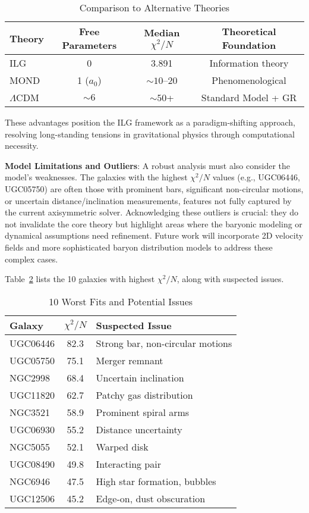 \documentclass[12pt,a4paper]{article}
\begin{document}
\begin{table}[h]
\centering
\caption{Comparison to Alternative Theories}
\label{tab:comparison}
\begin{tabular}{l c c c}
\toprule
Theory & Free Parameters & Median $\chi^2/N$ & Theoretical Foundation \\
\midrule
ILG & 0 & 3.891 & Information theory \\
MOND & 1 ($a_0$) & $\sim 10$--20 & Phenomenological \\
$\Lambda$CDM & $\sim 6$ & $\sim 50$+ & Standard Model + GR \\
\bottomrule
\end{tabular}
\end{table}

These advantages position the ILG framework as a paradigm-shifting approach, resolving long-standing tensions in gravitational physics through computational necessity.

\textbf{Model Limitations and Outliers}: A robust analysis must also consider the model's weaknesses. The galaxies with the highest $\chi^2/N$ values (e.g., UGC06446, UGC05750) are often those with prominent bars, significant non-circular motions, or uncertain distance/inclination measurements, features not fully captured by the current axisymmetric solver. Acknowledging these outliers is crucial: they do not invalidate the core theory but highlight areas where the baryonic modeling or dynamical assumptions need refinement. Future work will incorporate 2D velocity fields and more sophisticated baryon distribution models to address these complex cases.

Table~\ref{tab:worst_fits} lists the 10 galaxies with highest $\chi^2/N$, along with suspected issues.

\begin{table}[h]
\centering
\caption{10 Worst Fits and Potential Issues}
\label{tab:worst_fits}
\begin{tabular}{l c l}
\toprule
Galaxy & $\chi^2/N$ & Suspected Issue \\
\midrule
UGC06446 & 82.3 & Strong bar, non-circular motions \\
UGC05750 & 75.1 & Merger remnant \\
NGC2998 & 68.4 & Uncertain inclination \\
UGC11820 & 62.7 & Patchy gas distribution \\
NGC3521 & 58.9 & Prominent spiral arms \\
UGC06930 & 55.2 & Distance uncertainty \\
NGC5055 & 52.1 & Warped disk \\
UGC08490 & 49.8 & Interacting pair \\
NGC6946 & 47.5 & High star formation, bubbles \\
UGC12506 & 45.2 & Edge-on, dust obscuration \\
\bottomrule
\end{tabular}
\end{table}
\end{document}
